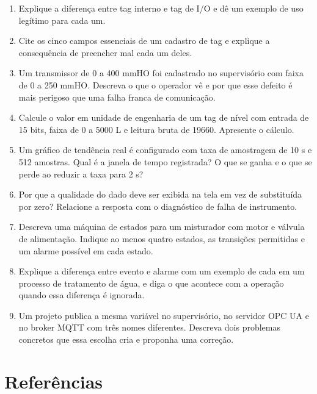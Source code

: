\begin{enumerate}
\def\labelenumi{\arabic{enumi}.}
\tightlist
\item
  Explique a diferença entre tag interno e tag de I/O e dê um exemplo de uso legítimo para cada um.
\item
  Cite os cinco campos essenciais de um cadastro de tag e explique a consequência de preencher mal cada um deles.
\item
  Um transmissor de 0 a 400 mmHO foi cadastrado no supervisório com faixa de 0 a 250 mmHO. Descreva o que o operador vê e por que esse defeito é mais perigoso que uma falha franca de comunicação.
\item
  Calcule o valor em unidade de engenharia de um tag de nível com entrada de 15 bits, faixa de 0 a 5000 L e leitura bruta de 19660. Apresente o cálculo.
\item
  Um gráfico de tendência real é configurado com taxa de amostragem de 10 s e 512 amostras. Qual é a janela de tempo registrada? O que se ganha e o que se perde ao reduzir a taxa para 2 s?
\item
  Por que a qualidade do dado deve ser exibida na tela em vez de substituída por zero? Relacione a resposta com o diagnóstico de falha de instrumento.
\item
  Descreva uma máquina de estados para um misturador com motor e válvula de alimentação. Indique ao menos quatro estados, as transições permitidas e um alarme possível em cada estado.
\item
  Explique a diferença entre evento e alarme com um exemplo de cada em um processo de tratamento de água, e diga o que acontece com a operação quando essa diferença é ignorada.
\item
  Um projeto publica a mesma variável no supervisório, no servidor OPC UA e no broker MQTT com três nomes diferentes. Descreva dois problemas concretos que essa escolha cria e proponha uma correção.
\end{enumerate}

\section{Referências}\label{referuxeancias}

